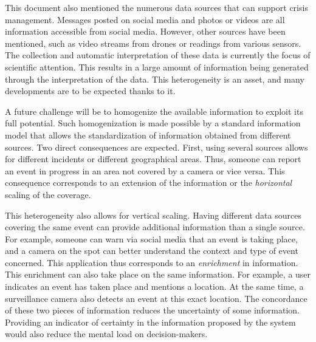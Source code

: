 This document also mentioned the numerous data sources that can support crisis management.
Messages posted on social media and photos or videos are all information accessible from social media.
However, other sources have been mentioned, such as video streams from drones or readings from various sensors.
The collection and automatic interpretation of these data is currently the focus of scientific attention.
This results in a large amount of information being generated through the interpretation of the data.
This heterogeneity is an asset, and many developments are to be expected thanks to it.

A future challenge will be to homogenize the available information to exploit its full potential.
Such homogenization is made possible by a standard information model that allows the standardization of information obtained from different sources.
Two direct consequences are expected.
First, using several sources allows for different incidents or different geographical areas.
Thus, someone can report an event in progress in an area not covered by a camera or vice versa.
This consequence corresponds to an extension of the information or the \emph{horizontal} scaling of the coverage.

This heterogeneity also allows for vertical scaling.
Having different data sources covering the same event can provide additional information than a single source.
For example, someone can warn via social media that an event is taking place, and a camera on the spot can better understand the context and type of event concerned.
This application thus corresponds to an \emph{enrichment} in information.
This enrichment can also take place on the same information.
For example, a user indicates an event has taken place and mentions a location.
At the same time, a surveillance camera also detects an event at this exact location.
The concordance of these two pieces of information reduces the uncertainty of some information.
Providing an indicator of certainty in the information proposed by the system would also reduce the mental load on decision-makers.

